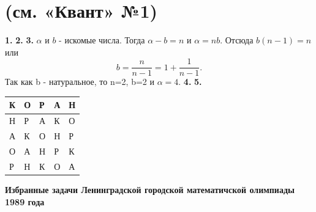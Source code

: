 \documentclass[8pt,twocolumn,a4paper]{article}
\begin{document}
\chapter{\small(см. «Квант» №1)} \newline
\newline
\textbf{\small1.}                        \newline
\textbf{\small2.}                        \newline
\textbf{\small3.}  $\alpha$ и $b$ - искомые числа. Тогда  $\alpha-b=n$ и $\alpha=nb.$ Отсюда $b(n-1)=n$ или $$ b=\frac{n}{n-1}=1+\frac{1}{n-1} .$$           
Так как b - натуральное, то n=2, b=2 и $\alpha=4$. \newline
\textbf{\small4.}                        \newline
\textbf{\small5.}                        

\newline

\begin{center}

\begin{tabular}{ | l | l | l | l | l |}
\hline
К & О & Р & А & Н \\ \hline
Н & Р & А & К & О \\ \hline
А & К & О & Н & Р \\ \hline
О & А & Н & Р & К \\ \hline
Р & Н & К & О & А \\
\hline
\end{tabular}

\end{center}
\newline \newline \newline

 \newline
\newline

\textbf{\small Избранные задачи Ленинградской городской математичской олимпиады 1989 года} \newline
\end{document}
